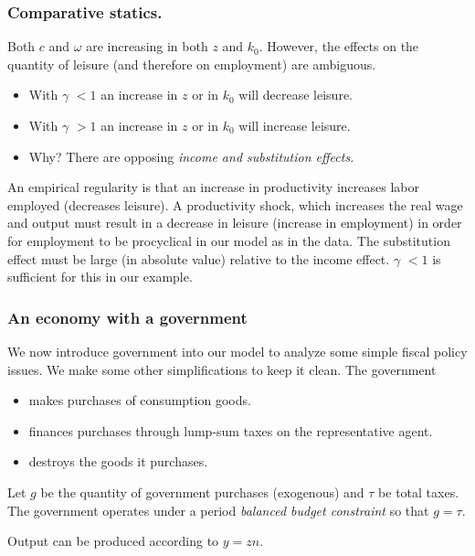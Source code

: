 \documentclass[aspectratio=169]{ltx-talk}
\begin{document}
\begin{frame}
\frametitle{Comparative statics.}
Both $c$ and $\omega $ are increasing in both $%
z$ and $k_{0}$. However, the effects on the quantity of leisure (and
therefore on employment) are ambiguous.

\begin{itemize}
\item With $\gamma $ $<1$ an increase in $z$ or in $k_{0}$ will decrease
leisure.

\item With $\gamma $ $>1$ an increase in $z$ or in $k_{0}$ will increase
leisure.

\item Why? There are opposing \textit{income and substitution effects. }
\end{itemize}

An empirical regularity is that an increase in productivity increases labor
employed (decreases leisure). A productivity shock, which increases the real
wage and output must result in a decrease in leisure (increase in
employment) in order for employment to be procyclical in our model as in the
data. The substitution effect must be large (in absolute value) relative to
the income effect. $\gamma $ $<1$ is sufficient for this in our example.
\end{frame}

\begin{frame}
\frametitle{An economy with a government}
We now introduce government into our model to analyze some simple fiscal
policy issues. We make some other simplifications to keep it clean. The
government

\begin{itemize}
\item makes purchases of consumption goods.

\item finances purchases through lump-sum taxes on the representative agent.

\item destroys the goods it purchases.
\end{itemize}

Let $g$ be the quantity of government purchases (exogenous) and $\tau $ be
total taxes. The government operates under a period \textit{balanced budget
constraint} so that $g=\tau .$

Output can be produced according to $y=zn$.
\end{frame}
\end{document}
